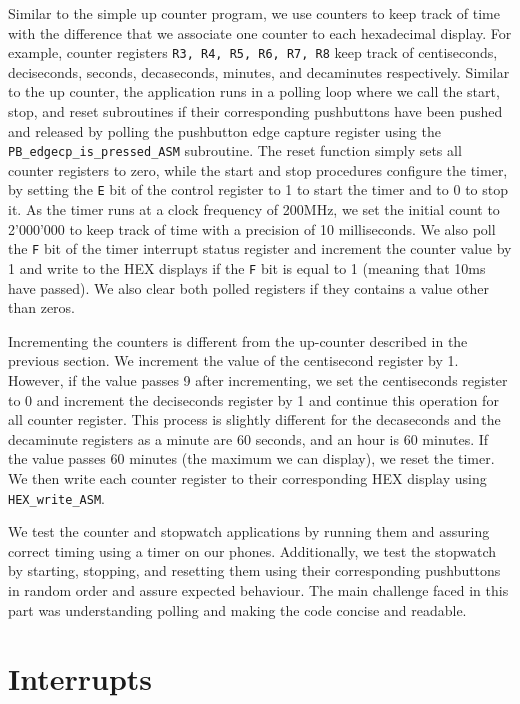 \documentclass[10pt]{article}
\begin{document}
Similar to the simple up counter program, we use counters to keep track of time with the difference that we associate one counter to each hexadecimal display. For example, counter registers \verb+R3, R4, R5, R6, R7, R8+ keep track of centiseconds, deciseconds, seconds, decaseconds, minutes, and decaminutes respectively. Similar to the up counter, the application runs in a polling loop where we call the start, stop, and reset subroutines if their corresponding pushbuttons have been pushed and released by polling the pushbutton edge capture register using the \verb+PB_edgecp_is_pressed_ASM+ subroutine. The reset function simply sets all counter registers to zero, while the start and stop procedures configure the timer, by setting the \verb+E+ bit of the control register to 1 to start the timer and to 0 to stop it. As the timer runs at a clock frequency of 200MHz, we set the initial count to 2'000'000 to keep track of time with a precision of 10 milliseconds. We also poll the \verb+F+ bit of the timer interrupt status register and increment the counter value by 1 and write to the HEX displays if the \verb+F+ bit is equal to 1 (meaning that 10ms have passed). We also clear both polled registers if they contains a value other than zeros.

Incrementing the counters is different from the up-counter described in the previous section. We increment the value of the centisecond register by 1. However, if the value passes 9 after incrementing, we set the centiseconds register to 0 and increment the deciseconds register by 1 and continue this operation for all counter register. This process is slightly different for the decaseconds and the decaminute registers as a minute are 60 seconds, and an hour is 60 minutes. If the value passes 60 minutes (the maximum we can display), we reset the timer. We then write each counter register to their corresponding HEX display using \verb+HEX_write_ASM+.

We test the counter and stopwatch applications by running them and assuring correct timing using a timer on our phones. Additionally, we test the stopwatch by starting, stopping, and resetting them using their corresponding pushbuttons in random order and assure expected behaviour. The main challenge faced in this part was understanding polling and making the code concise and readable.
\section{Interrupts}
\end{document}
